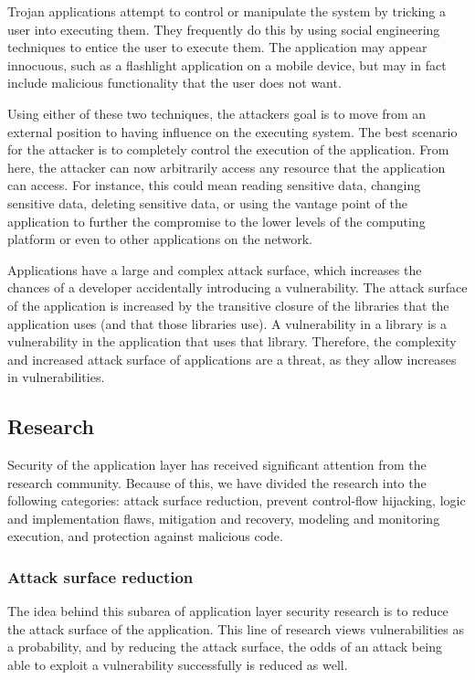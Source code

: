 \documentclass[11pt,letterpaper]{article}
\begin{document}
Trojan applications attempt to control or manipulate the system by
tricking a user into executing them. They frequently do this by using
social engineering techniques to entice the user to execute them. The
application may appear innocuous, such as a flashlight application on
a mobile device, but may in fact include malicious functionality that
the user does not want. 

Using either of these two techniques, the attackers goal is to move
from an external position to having influence on the executing system.
The best scenario for the attacker is to completely control the
execution of the application. From here, the attacker can now
arbitrarily access any resource that the application can access. For
instance, this could mean reading sensitive data, changing sensitive
data, deleting sensitive data, or using the vantage point of the
application to further the compromise to the lower levels of the
computing platform or even to other applications on the network.

Applications have a large and complex attack surface, which increases
the chances of a developer accidentally introducing a vulnerability.
The attack surface of the application is increased by the transitive
closure of the libraries that the application uses (and that those
libraries use). A vulnerability in a library is a vulnerability in the
application that uses that library. Therefore, the complexity and
increased attack surface of applications are a threat, as they allow
increases in vulnerabilities. 

\subsection{Research}

Security of the application layer has received significant attention
from the research community. Because of this, we have divided the
research into the following categories: attack surface reduction, prevent control-flow
hijacking, logic and implementation flaws, mitigation and recovery,
modeling and monitoring execution, and protection against malicious
code.

\subsubsection{Attack surface reduction}

The idea behind this subarea of application layer security research is
to reduce the attack surface of the application. This line of research
views vulnerabilities as a probability, and by reducing the attack
surface, the odds of an attack being able to exploit a
vulnerability successfully is reduced as well.
\end{document}
